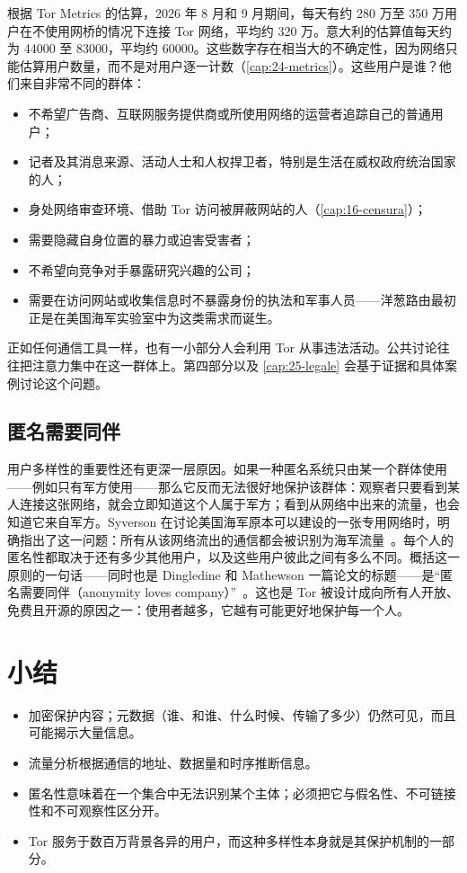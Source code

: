 根据 Tor Metrics 的估算，2026 年 8 月和 9 月期间，每天有约 280 万至 350 万用户在不使用网桥的情况下连接 Tor 网络，平均约 320 万。意大利的估算值每天约为 \num{44000} 至 \num{83000}，平均约 \num{60000}。这些数字存在相当大的不确定性，因为网络只能估算用户数量，而不是对用户逐一计数（\cref{cap:24-metrics}）。这些用户是谁？他们来自非常不同的群体：
\begin{itemize}
  \item 不希望广告商、互联网服务提供商或所使用网络的运营者追踪自己的普通用户；
  \item 记者及其消息来源、活动人士和人权捍卫者，特别是生活在威权政府统治国家的人；
  \item 身处网络审查环境、借助 Tor 访问被屏蔽网站的人（\cref{cap:16-censura}）；
  \item 需要隐藏自身位置的暴力或迫害受害者；
  \item 不希望向竞争对手暴露研究兴趣的公司；
  \item 需要在访问网站或收集信息时不暴露身份的执法和军事人员——洋葱路由最初正是在美国海军实验室中为这类需求而诞生。
\end{itemize}
正如任何通信工具一样，也有一小部分人会利用 Tor 从事违法活动。公共讨论往往把注意力集中在这一群体上。第四部分以及 \cref{cap:25-legale} 会基于证据和具体案例讨论这个问题。

\subsection{匿名需要同伴}

用户多样性的重要性还有更深一层原因。如果一种匿名系统只由某一个群体使用——例如只有军方使用——那么它反而无法很好地保护该群体：观察者只要看到某人连接这张网络，就会立即知道这个人属于军方；看到从网络中出来的流量，也会知道它来自军方。Syverson 在讨论美国海军原本可以建设的一张专用网络时，明确指出了这一问题：所有从该网络流出的通信都会被识别为海军流量~\cite{syverson2011peel}。每个人的匿名性都取决于还有多少其他用户，以及这些用户彼此之间有多么不同。概括这一原则的一句话——同时也是 Dingledine 和 Mathewson 一篇论文的标题——是\enquote{匿名需要同伴（anonymity loves company）}~\cite{dingledine2006company}。这也是 Tor 被设计成向所有人开放、免费且开源的原因之一：使用者越多，它越有可能更好地保护每一个人。

\section*{小结}
\begin{itemize}
  \item 加密保护内容；元数据（谁、和谁、什么时候、传输了多少）仍然可见，而且可能揭示大量信息。
  \item 流量分析根据通信的地址、数据量和时序推断信息。
  \item 匿名性意味着在一个集合中无法识别某个主体；必须把它与假名性、不可链接性和不可观察性区分开。
  \item Tor 服务于数百万背景各异的用户，而这种多样性本身就是其保护机制的一部分。
\end{itemize}

